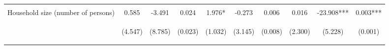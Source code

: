 \begin{center}
\begin{tabular}{lccccccccc}
\vspace{4pt} & \begin{footnotesize}[0.990]\end{footnotesize} & \begin{footnotesize}\end{footnotesize} & \begin{footnotesize}\end{footnotesize} & \begin{footnotesize}[0.366]\end{footnotesize} & \begin{footnotesize}\end{footnotesize} & \begin{footnotesize}\end{footnotesize} & \begin{footnotesize}[0.070]\end{footnotesize} & \begin{footnotesize}\end{footnotesize} & \begin{footnotesize}\end{footnotesize} \\
Household size (number of persons) & 0.585 & -3.491 & 0.024 & 1.976* & -0.273 & 0.006 & 0.016 & -23.908*** & 0.003*** \\
 & \begin{footnotesize}(4.547)\end{footnotesize} & \begin{footnotesize}(8.785)\end{footnotesize} & \begin{footnotesize}(0.023)\end{footnotesize} & \begin{footnotesize}(1.032)\end{footnotesize} & \begin{footnotesize}(3.145)\end{footnotesize} & \begin{footnotesize}(0.008)\end{footnotesize} & \begin{footnotesize}(2.300)\end{footnotesize} & \begin{footnotesize}(5.228)\end{footnotesize} & \begin{footnotesize}(0.001)\end{footnotesize} \\

\end{tabular}
\end{center}
